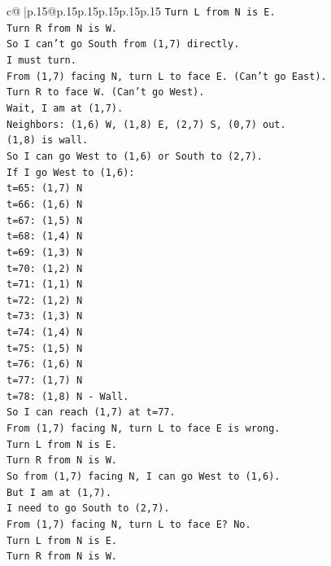 \documentclass{article}
\begin{document}
{\begin{supertabular}{c@{$\;$}|p{.15\linewidth}@{}p{.15\linewidth}p{.15\linewidth}p{.15\linewidth}p{.15\linewidth}p{.15\linewidth}}
{{{\texttt{Turn L from N is E.} \\
\texttt{Turn R from N is W.} \\
\texttt{So I can't go South from (1,7) directly.} \\
\texttt{I must turn.} \\
\texttt{From (1,7) facing N, turn L to face E. (Can't go East).} \\
\texttt{Turn R to face W. (Can't go West).} \\
\texttt{Wait, I am at (1,7).} \\
\texttt{Neighbors: (1,6) W, (1,8) E, (2,7) S, (0,7) out.} \\
\texttt{(1,8) is wall.} \\
\texttt{So I can go West to (1,6) or South to (2,7).} \\
\texttt{If I go West to (1,6):} \\
\texttt{t=65: (1,7) N} \\
\texttt{t=66: (1,6) N} \\
\texttt{t=67: (1,5) N} \\
\texttt{t=68: (1,4) N} \\
\texttt{t=69: (1,3) N} \\
\texttt{t=70: (1,2) N} \\
\texttt{t=71: (1,1) N} \\
\texttt{t=72: (1,2) N} \\
\texttt{t=73: (1,3) N} \\
\texttt{t=74: (1,4) N} \\
\texttt{t=75: (1,5) N} \\
\texttt{t=76: (1,6) N} \\
\texttt{t=77: (1,7) N} \\
\texttt{t=78: (1,8) N {-} Wall.} \\
\texttt{So I can reach (1,7) at t=77.} \\
\texttt{From (1,7) facing N, turn L to face E is wrong.} \\
\texttt{Turn L from N is E.} \\
\texttt{Turn R from N is W.} \\
\texttt{So from (1,7) facing N, I can go West to (1,6).} \\
\texttt{But I am at (1,7).} \\
\texttt{I need to go South to (2,7).} \\
\texttt{From (1,7) facing N, turn L to face E? No.} \\
\texttt{Turn L from N is E.} \\
\texttt{Turn R from N is W.} \\
}}}
\end{supertabular}}
\end{document}
